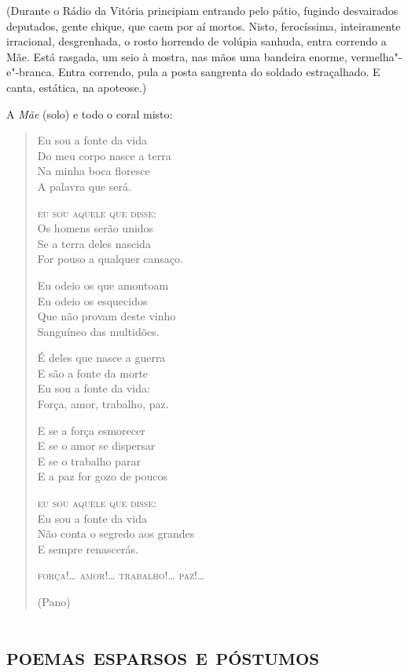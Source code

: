 \hfill\parbox{150pt}{
(Durante o Rádio da Vitória principiam entrando pelo pátio, fugindo
desvairados deputados, gente chique, que caem por aí mortos. Nisto,
ferocíssima, inteiramente irracional, desgrenhada, o rosto horrendo de
volúpia sanhuda, entra correndo a Mãe. Está rasgada, um seio à mostra,
nas mãos uma bandeira enorme, vermelha"-e"-branca. Entra correndo, pula a
posta sangrenta do soldado estraçalhado. E canta, estática, na
apoteose.)
}

A \emph{Mãe} (solo) e todo o coral misto:

\begin{verse}
Eu sou a fonte da vida\\
Do meu corpo nasce a terra\\
Na minha boca floresce\\
A palavra que será.

\textsc{eu sou aquele que disse:}\\
Os homens serão unidos\\
Se a terra deles nascida\\
For pouso a qualquer cansaço.

Eu odeio os que amontoam\\
Eu odeio os esquecidos\\
Que não provam deste vinho\\
Sanguíneo das multidões.

É deles que nasce a guerra\\
E são a fonte da morte\\
Eu sou a fonte da vida:\\
Força, amor, trabalho, paz.

E se a força esmorecer\\
E se o amor se dispersar\\
E se o trabalho parar\\
E a paz for gozo de poucos

\textsc{eu sou aquele que disse}:\\
Eu sou a fonte da vida\\
Não conta o segredo aos grandes\\
E sempre renascerás.

\textsc{força}!\ldots{} \textsc{amor}!\ldots{} \textsc{trabalho}!\ldots{} \textsc{paz}!\ldots{}

\hfill(Pano)
\end{verse}

\movetooddpage
\part{\textsc{poemas esparsos e póstumos}}

